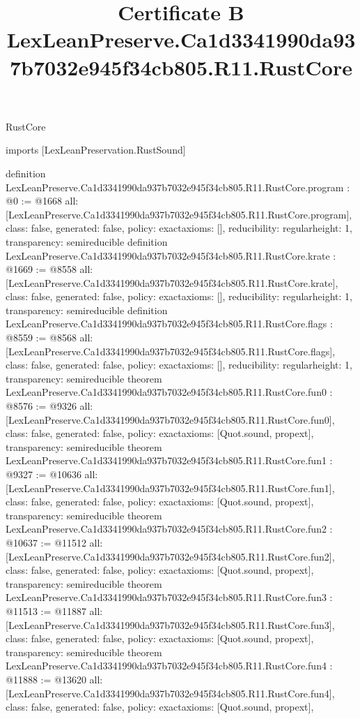 \begin{lexlean}{RustCore}
\title{Certificate B LexLeanPreserve.Ca1d3341990da937b7032e945f34cb805.R11.RustCore}
\begin{coremodule}
imports [LexLeanPreservation.RustSound]

definition LexLeanPreserve.Ca1d3341990da937b7032e945f34cb805.R11.RustCore.program : @0 := @1668 {
  all: [LexLeanPreserve.Ca1d3341990da937b7032e945f34cb805.R11.RustCore.program],
  class: false,
  generated: false,
  policy: exact{axioms: []},
  reducibility: regular{height: 1},
  transparency: semireducible
}
definition LexLeanPreserve.Ca1d3341990da937b7032e945f34cb805.R11.RustCore.krate : @1669 := @8558 {
  all: [LexLeanPreserve.Ca1d3341990da937b7032e945f34cb805.R11.RustCore.krate],
  class: false,
  generated: false,
  policy: exact{axioms: []},
  reducibility: regular{height: 1},
  transparency: semireducible
}
definition LexLeanPreserve.Ca1d3341990da937b7032e945f34cb805.R11.RustCore.flags : @8559 := @8568 {
  all: [LexLeanPreserve.Ca1d3341990da937b7032e945f34cb805.R11.RustCore.flags],
  class: false,
  generated: false,
  policy: exact{axioms: []},
  reducibility: regular{height: 1},
  transparency: semireducible
}
theorem LexLeanPreserve.Ca1d3341990da937b7032e945f34cb805.R11.RustCore.fun0 : @8576 := @9326 {
  all: [LexLeanPreserve.Ca1d3341990da937b7032e945f34cb805.R11.RustCore.fun0],
  class: false,
  generated: false,
  policy: exact{axioms: [Quot.sound, propext]},
  transparency: semireducible
}
theorem LexLeanPreserve.Ca1d3341990da937b7032e945f34cb805.R11.RustCore.fun1 : @9327 := @10636 {
  all: [LexLeanPreserve.Ca1d3341990da937b7032e945f34cb805.R11.RustCore.fun1],
  class: false,
  generated: false,
  policy: exact{axioms: [Quot.sound, propext]},
  transparency: semireducible
}
theorem LexLeanPreserve.Ca1d3341990da937b7032e945f34cb805.R11.RustCore.fun2 : @10637 := @11512 {
  all: [LexLeanPreserve.Ca1d3341990da937b7032e945f34cb805.R11.RustCore.fun2],
  class: false,
  generated: false,
  policy: exact{axioms: [Quot.sound, propext]},
  transparency: semireducible
}
theorem LexLeanPreserve.Ca1d3341990da937b7032e945f34cb805.R11.RustCore.fun3 : @11513 := @11887 {
  all: [LexLeanPreserve.Ca1d3341990da937b7032e945f34cb805.R11.RustCore.fun3],
  class: false,
  generated: false,
  policy: exact{axioms: [Quot.sound, propext]},
  transparency: semireducible
}
theorem LexLeanPreserve.Ca1d3341990da937b7032e945f34cb805.R11.RustCore.fun4 : @11888 := @13620 {
  all: [LexLeanPreserve.Ca1d3341990da937b7032e945f34cb805.R11.RustCore.fun4],
  class: false,
  generated: false,
  policy: exact{axioms: [Quot.sound, propext]},
}
\end{coremodule}
\end{lexlean}
